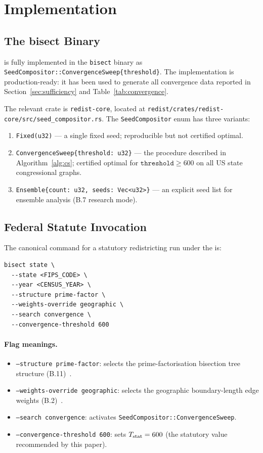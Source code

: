 \section{Implementation}
\label{sec:implementation}

\subsection{The bisect Binary}

\cs{} is fully implemented in the \texttt{bisect} binary as
\texttt{SeedCompositor::ConvergenceSweep\{threshold\}}.
The implementation is production-ready: it has been used to generate all
convergence data reported in Section~\ref{sec:sufficiency} and Table~\ref{tab:convergence}.

The relevant crate is \texttt{redist-core}, located at
\texttt{redist/crates/redist-core/src/seed\_compositor.rs}.
The \texttt{SeedCompositor} enum has three variants:

\begin{enumerate}
\item \texttt{Fixed(u32)} --- a single fixed seed; reproducible but not
      certified optimal.
\item \texttt{ConvergenceSweep\{threshold: u32\}} --- the \cs{} procedure
      described in Algorithm~\ref{alg:cs}; certified optimal for
      $\texttt{threshold} \ge 600$ on all US state congressional graphs.
\item \texttt{Ensemble\{count: u32, seeds: Vec<u32>\}} --- an explicit seed
      list for ensemble analysis (B.7 research mode).
\end{enumerate}

\subsection{Federal Statute Invocation}

The canonical command for a statutory redistricting run under the \dia{}
is:

\begin{verbatim}
bisect state \
  --state <FIPS_CODE> \
  --year <CENSUS_YEAR> \
  --structure prime-factor \
  --weights-override geographic \
  --search convergence \
  --convergence-threshold 600
\end{verbatim}

\paragraph{Flag meanings.}
\begin{itemize}
\item \texttt{--structure prime-factor}: selects the \ar{} prime-factorisation
      bisection tree structure (B.11)~\citep{b11paper}.
\item \texttt{--weights-override geographic}: selects the geographic boundary-length
      edge weights (B.2)~\citep{b2paper}.
\item \texttt{--search convergence}: activates \texttt{SeedCompositor::ConvergenceSweep}.
\item \texttt{--convergence-threshold 600}: sets $T_{\mathrm{stat}} = 600$ (the statutory
      value recommended by this paper).
\end{itemize}


